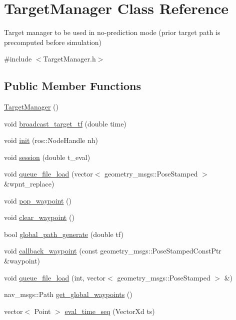 \hypertarget{class_target_manager}{}\section{Target\+Manager Class Reference}
\label{class_target_manager}


Target manager to be used in no-\/prediction mode (prior target path is precomputed before simulation)  




{\ttfamily \#include $<$Target\+Manager.\+h$>$}

\subsection*{Public Member Functions}
\begin{DoxyCompactItemize}
\item 
\hyperlink{class_target_manager_a3c7f0783381de386b697d8f27846aed1}{Target\+Manager} ()
\item 
void \hyperlink{class_target_manager_a2f60f20f32700c71852fea340cdf1240}{broadcast\+\_\+target\+\_\+tf} (double time)
\item 
void \hyperlink{class_target_manager_a293bcb3b559c6e7c4ef549873791f092}{init} (ros\+::\+Node\+Handle nh)
\item 
void \hyperlink{class_target_manager_a4af88c70bb8a0af0171ee9a49536d5c0}{session} (double t\+\_\+eval)
\item 
void \hyperlink{class_target_manager_a8b96689879cecac3d9109914eb6230ef}{queue\+\_\+file\+\_\+load} (vector$<$ geometry\+\_\+msgs\+::\+Pose\+Stamped $>$ \&wpnt\+\_\+replace)
\item 
void \hyperlink{class_target_manager_af362d78ae6b0cc0a3ea288b2c138f482}{pop\+\_\+waypoint} ()
\item 
void \hyperlink{class_target_manager_a13242c4a8b96b97cfeddea19aabc1181}{clear\+\_\+waypoint} ()
\item 
bool \hyperlink{class_target_manager_a1c0e48d7a623e8b7caa11c6b1832956b}{global\+\_\+path\+\_\+generate} (double tf)
\item 
void \hyperlink{class_target_manager_adc84c02e4501b1a53556c766d50bc8b5}{callback\+\_\+waypoint} (const geometry\+\_\+msgs\+::\+Pose\+Stamped\+Const\+Ptr \&waypoint)
\item 
void \hyperlink{class_target_manager_a861a5feb4828c3174308781eb0efc915}{queue\+\_\+file\+\_\+load} (int, vector$<$ geometry\+\_\+msgs\+::\+Pose\+Stamped $>$ \&)
\item 
nav\+\_\+msgs\+::\+Path \hyperlink{class_target_manager_a747b82bf5cb4d1d3574dbc08a117538f}{get\+\_\+global\+\_\+waypoints} ()
\item 
vector$<$ Point $>$ \hyperlink{class_target_manager_a63bbc724844890316a654380d0354e93}{eval\+\_\+time\+\_\+seq} (Vector\+Xd ts)
\end{DoxyCompactItemize}
